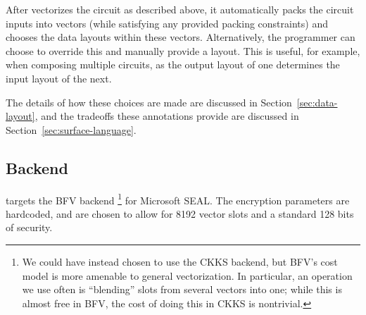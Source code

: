 After \system vectorizes the circuit as described above, it automatically packs the circuit inputs into vectors (while satisfying any provided packing constraints) and chooses the data layouts within these vectors.
Alternatively, the programmer can choose to override this and manually provide a layout. 
This is useful, for example, when composing multiple circuits, as the output layout of one determines the input layout of the next.

The details of how these choices are made are discussed in Section~\ref{sec:data-layout}, and the tradeoffs these annotations provide are discussed in Section~\ref{sec:surface-language}. 
\subsection{Backend}
\system targets the BFV backend \footnote{We could have instead chosen to use the CKKS backend, but BFV's cost model is more amenable to general vectorization. In particular, an operation we use often is ``blending'' slots from several vectors into one; while this is almost free in BFV, the cost of doing this in CKKS is nontrivial. } for Microsoft SEAL\cite{seal}.
The encryption parameters are hardcoded, and are chosen to allow for 8192 vector slots and a standard 128 bits of security.